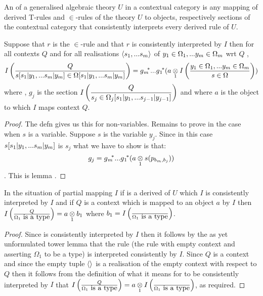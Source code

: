 \begin{definition}
An  of a generalised algebraic theory $U$ in a contextual category \catcw is  any mapping 
of derived T-rules and $\in$-rules of the theory $U$ to objects, respectively sections of the contextual category \catcw that
consistently interprets every derived rule of $U$.
\end{definition}

\begin{lemma}
Suppose that $r$ is the $\in$-rule \ZsOmega and that
$r$ is consistently interpreted by $I$ 
then
for all contexts $Q$ and for all realisations $\tuple{\sm}$ of $\yOmega{m}$ wrt $Q$  , 
$$ \Imappedrule{Q}{\ofT{s[\SUBsFORy{m}]}{\Omega[\SUBsFORy{m}]}} = \gmstar...\gonestar(\crossx{a}{\Imappedrule{\yOmega{m}}{\ofT{s}{\Omega}}}{1})$$
where \foreachj, $g_j$ is the section
$\displaystyle\Imappedrule{Q}{ \ofT{s_j}{\Omega_j[\SUBsFORy{j-1}]}}$
and where $a$ is the object to which $I$ maps context $Q$.
\end{lemma}
\begin{proof}
The defn gives us this for non-variables. Remains to prove in the case when $s$ is a variable. Suppose $s$ is the variable
$y_j$. Since in this case $s[\SUBsFORy{m}]$ is $s_j$ what we have to show is that:
$$g_j = \gmvectorstar(\crossx{a}{s(p_{b_m,b_j}}{1}))$$. This is lemma .
\end{proof}


\begin{lemma}
In the situation of  partial mapping $I$ 
if \ZOmega is a derived of $U$  which $I$  is consistently interpreted by $I$ 
and if $Q$ is a context which is mapped to an object $a$ by $I$ 
then $\Imappedrule{Q}{\isT{\Omega_1}}=\crossx{a}{b_1}{1}$ where $b_1=\Imappedrule{}{\isT{\Omega_1}}$.
\end{lemma}
\begin{proof}
Since \ZOmega is consistently interpreted by $I$ then it follows by the as yet unformulated tower lemma that the rule 
\gatdisplayrule{}{\isT{\Omega}} (the rule with empty context and asserting $\Omega_1$ to be a type) is interpreted consistently
by $I$. Since $Q$ is a context and since the empty tuple $\tuple{}$ is a realisation of the empty context with respect to $Q$ then it follows from the definition of what it means for  \gatdisplayrule{}{\isT{\Omega}} to be consistently interpreted by $I$ that
$\Imappedrule{Q}{\isT{\Omega_1}}=\crossx{a}{\Imappedrule{}{\isT{\Omega_1}}}{1}$, as required.
\end{proof}


